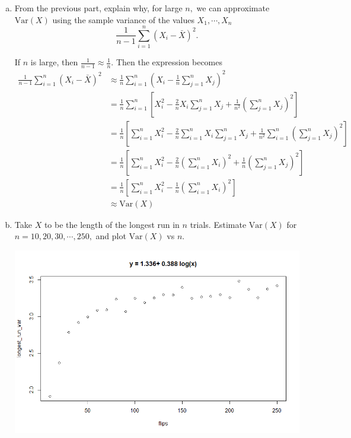 \documentclass{article}
\newcommand{\var}{\mathrm{Var}}
\begin{document}
\begin{enumerate}
\begin{enumerate}[(a)]
			\item From the previous part, explain why, for large $n,$ we can approximate $\var(X)$ using the sample variance of the values $X_1, \cdots, X_n$ \[\frac{1}{n-1}\sum_{i=1}^n (X_i-\bar{X})^2.\]
				\begin{soln}
				If $n$ is large, then $\frac{1}{n-1}\approx \frac{1}{n}.$ Then the expression becomes 
				\begin{align*}
					\frac{1}{n-1}\sum_{i=1}^{n}(X_i-\bar{X})^2 &\approx \frac{1}{n}\sum_{i=1}^{n}\left( X_i-\frac{1}{n}\sum_{j=1}^{n}X_j \right)^2 \\
					&= \frac{1}{n} \sum_{i=1}^{n}\left[ X_i^2 - \frac{2}{n}X_i\sum_{j=1}^{n} X_j + \frac{1}{n^2}\left(\sum_{j=1}^{n}X_j\right)^2 \right] \\
					&= \frac{1}{n}\left[ \sum_{i=1}^{n} X_i^2 - \frac{2}{n}\sum_{i=1}^{n}X_i\sum_{j=1}^{n} X_j + \frac{1}{n^2}\sum_{i=1}^{n}\left( \sum_{j=1}^{n} X_j \right)^2 \right] \\
					&= \frac{1}{n}\left[ \sum_{i=1}^{n}X_i^2 - \frac{2}{n}\left( \sum_{i=1}^{n} X_i \right)^2 + \frac{1}{n}\left( \sum_{j=1}^{n} X_j \right)^2  \right] \\
					&= \frac{1}{n} \left[ \sum_{i=1}^{n} X_i^2 - \frac{1}{n}\left(\sum_{i=1}^{n} X_i\right)^2\right] \\
					&\approx \var(X)
				\end{align*}
				
				\end{soln}

			\item Take $X$ to be the length of the longest run in $n$ trials. Estimate $\var(X)$ for $n=10, 20, 30, \cdots, 250,$ and plot $\var(X)$ vs $n.$
				\begin{center}
					\includegraphics[width=14cm]{longest_run_var.png}
				\end{center}	
				

\end{enumerate}
\end{enumerate}
\end{document}
